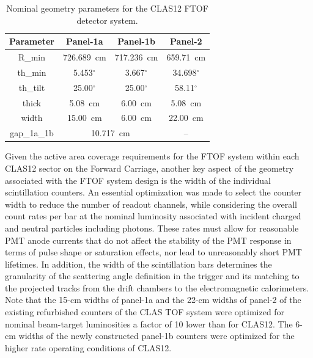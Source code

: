 \documentclass{elsart}
\begin{document}
\begin{table}[htbp]
\begin{center}
\begin{tabular} {c|c|c|c} \hline
Parameter & Panel-1a &  Panel-1b & Panel-2 \\ \hline
R\_min      & 726.689~cm & 717.236~cm & 659.71~cm \\ \hline
th\_min    & 5.453$^\circ$ & 3.667$^\circ$ & 34.698$^\circ$ \\ \hline
th\_tilt    & 25.00$^\circ$ & 25.00$^\circ$ & 58.11$^\circ$ \\ \hline
thick        & 5.08~cm           & 6.00~cm         & 5.08~cm \\ \hline
width       & 15.00~cm         & 6.00~cm         & 22.00~cm \\ \hline
gap\_1a\_1b & \multicolumn{2}{c|}{10.717~cm} &  -- \\ \hline
\end{tabular}
\caption{Nominal geometry parameters for the CLAS12 FTOF detector system.}
\label{geom-parms}
\end{center}
\end{table}

Given the active area coverage requirements for the FTOF system within each CLAS12 sector on the
Forward Carriage, another key aspect of the geometry associated with the FTOF system design is
the width of the individual scintillation counters. An essential optimization was made to select the
counter width to reduce the number of readout channels, while considering the overall count rates per
bar at the nominal luminosity associated with incident charged and neutral particles including photons.
These rates must allow for reasonable PMT anode currents that do not affect the stability of the PMT
response in terms of pulse shape or saturation effects, nor lead to unreasonably short PMT lifetimes.
In addition, the width of the scintillation bars determines the granularity of the scattering angle definition
in the trigger and its matching to the projected tracks from the drift chambers to the electromagnetic
calorimeters. Note that the 15-cm widths of panel-1a and the 22-cm widths of panel-2 of the existing
refurbished counters of the CLAS TOF system were optimized for nominal beam-target luminosities a
factor of 10 lower than for CLAS12. The 6-cm widths of the newly constructed panel-1b counters were
optimized for the higher rate operating conditions of CLAS12.
\end{document}
